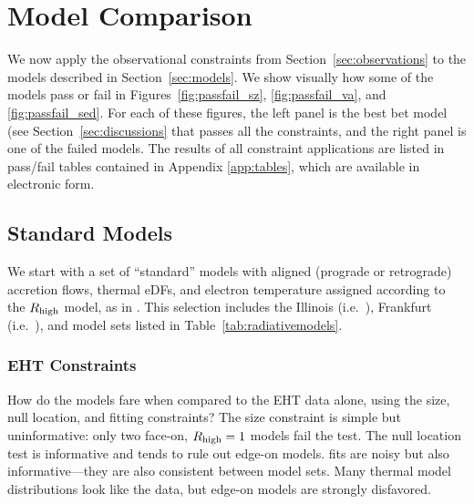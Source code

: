 \section{Model Comparison}\label{sec:comparisons}

We now apply the observational constraints from
Section~\ref{sec:observations} to the models described in
Section~\ref{sec:models}.
We show visually how some of the models pass or fail in
Figures~\ref{fig:passfail_sz}, \ref{fig:passfail_va}, and
\ref{fig:passfail_sed}.
For each of these figures, the left panel is the best bet model (see
Section~\ref{sec:discussions} that passes all the constraints, and the
right panel is one of the failed models.
The results of all constraint applications are listed in pass/fail
tables contained in Appendix \ref{app:tables}, which are available in
electronic form.

\subsection{Standard Models}\label{subsec:thermal}


We start with a set of ``standard'' models with aligned (prograde or retrograde) accretion flows, thermal eDFs, and electron temperature assigned according to the $R_\mathrm{high}$ model, as in .  This selection includes the Illinois (i.e.\ \kharma), Frankfurt (i.e.\ \bhac), and \hamr model sets listed in Table~\ref{tab:radiativemodels}.

\subsubsection{EHT Constraints}

How do the models fare when compared to the EHT data alone, using the size, null location, and \mring fitting constraints?  The size constraint is simple but uninformative: only two face-on, $R_\mathrm{high} = 1$ models fail the test.  The null location test is informative and tends to rule out edge-on models.  \Mring fits are noisy but also informative---they are also consistent between model sets.  Many thermal model distributions look like the data, but edge-on models are strongly disfavored.

